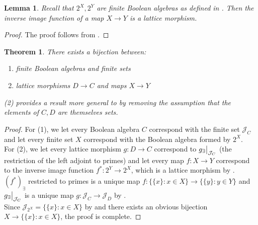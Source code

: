 \documentclass{article}
\newtheorem{theorem}[proposition]{Theorem}
\newtheorem{lemma}[proposition]{Lemma}
\newcommand\restr[2]{{%
  \left.\kern-\nulldelimiterspace %
  #1 %
  \vphantom{\big|} %
  \right|_{#2} %
}}
\begin{document}
\begin{lemma} \label{lem:inv-image-is-lattice-morphism}
Recall that $2^X, 2^Y$ are finite Boolean algebras as defined in . Then the inverse image function of a map $X \to Y$ is a lattice morphism.
\end{lemma}

\begin{proof}
The proof follows from .
\end{proof}

\begin{theorem} \label{thm:ba-set-bijection}
There exists a bijection between:
\begin{enumerate}
    \item{finite Boolean algebras and finite sets}
    \item{lattice morphisms $D \to C$ and maps $X \to Y$}
\end{enumerate}
(2) provides a result more general to  by removing the assumption that the elements of $C, D$ are themselves sets.
\end{theorem}

\begin{proof}
For (1), we let every Boolean algebra $C$ correspond with the finite set $\mathcal{J}_C$ and let every finite set $X$ correspond with the Boolean algebra formed by $2^X$. \\

For (2), we let every lattice morphism $g : D \to C$ correspond to $\restr{g_\exists}{\mathcal{J}_C}$ (the restriction of the left adjoint to primes) and let every map $f: X \to Y$ correspond to the inverse image function $f^* : 2^Y \to 2^X$, which is a lattice morphism by . $(f^*)_\exists$ restricted to primes is a unique map $f : \{\{x\} : x \in X\} \to \{\{y\} : y \in Y\}$ and $\restr{g_\exists}{\mathcal{J}_C}$ is a unique map $g : \mathcal{J}_C \to \mathcal{J}_D$ by . \\

Since $\mathcal{J}_{2^X} = \{\{x\} : x \in X\}$ by  and there exists an obvious bijection $X \to \{\{x\} : x \in X\}$, the proof is complete.
\end{proof}
\end{document}
